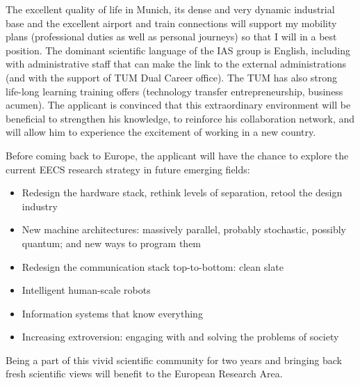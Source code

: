 The excellent  quality of life in  Munich, its
dense and very  dynamic industrial base and the  excellent airport and
train connections will support  my mobility plans (professional duties
as well as  personal journeys) so that I will in  a best position. The
dominant scientific  language of the IAS group  is English, including
with  administrative staff  that can  make  the link  to the  external
administrations (and with the support  of TUM Dual Career office). The
TUM  has also  strong life-long  learning training  offers (technology
transfer entrepreneurship, business acumen).   The applicant is convinced that this
extraordinary  environment   will  be  beneficial   to  strengthen  his
knowledge, to reinforce his collaboration network, and will allow him to
experience the excitement of working in a new country.

Before coming back to Europe, the applicant will have the chance to explore 
the current EECS research strategy in future emerging fields:
\begin{itemize}
\item Redesign the hardware stack, rethink levels of separation, retool the design industry
\item New machine architectures: massively parallel, probably stochastic, possibly quantum; and new ways to program them
\item Redesign the communication stack top-to-bottom: clean slate
\item Intelligent human-scale robots
\item Information systems that know everything
\item Increasing extroversion: engaging with and solving the problems of society
\end{itemize}
Being a part of this vivid scientific community for two years and bringing back fresh 
scientific views will benefit to the European Research Area.

